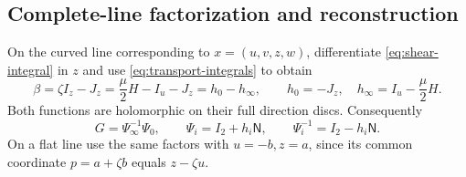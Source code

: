 \documentclass[11pt]{article}
\numberwithin{equation}{section}
\theoremstyle{definition}
\theoremstyle{remark}
\newcommand{\NN}{\mathsf N}
\newcommand{\II}{I_2}
\begin{document}
\subsection{Complete-line factorization and reconstruction}

On the curved line corresponding to $x=(u,v,z,w)$, differentiate \eqref{eq:shear-integral} in $z$ and use \eqref{eq:transport-integrals} to obtain
\begin{equation}\label{eq:beta-split}
\beta=\zeta I_z-J_z=\frac\mu2H-I_u-J_z=h_0-h_\infty,
\qquad
h_0=-J_z,\quad h_\infty=I_u-\frac\mu2H.
\end{equation}
Both functions are holomorphic on their full direction discs. Consequently
\begin{equation}\label{eq:explicit-factorization}
G=\Psi_\infty^{-1}\Psi_0,
\qquad \Psi_i=\II+h_i\NN,
\qquad \Psi_i^{-1}=\II-h_i\NN.
\end{equation}
On a flat line use the same factors with $u=-b,z=a$, since its common coordinate $p=a+\zeta b$ equals $z-\zeta u$.
\end{document}
